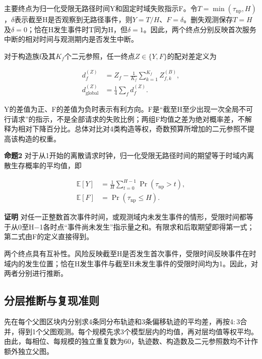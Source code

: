 \documentclass[UTF8,a4paper,twocolumn,fontset=none,zihao=5]{ctexart}
\begin{document}
主要终点为归一化受限无路径时间Y和固定时域失败指示F。令$T=\min(\tau_{\mathrm{np}},H)$，$\delta$表示截至H是否观察到无路径事件，则$Y=T/H$、$F=\delta$。删失观测保存$T=H$及$\delta=0$；恰在H发生事件时T同为H，但$\delta=1$。因此，两个终点分别反映首次服务中断的相对时间与观测期内是否发生中断。


对于构造族f及其$K_f$个二元参照，任一终点$Z\in\{Y,F\}$的配对差定义为



\begin{equation}
\begin{aligned}d_f^{(Z)}&=Z_f-\frac{1}{K_f}\sum_{k=1}^{K_f}Z_{f,k}^{(B)},\\d_{\mathrm{global}}^{(Z)}&=\frac{1}{4}\sum_f d_f^{(Z)}.\end{aligned}
\label{eq:13}\end{equation}


Y的差值为正、F的差值为负时表示有利方向。F是“截至H至少出现一次全局不可行请求”的指示，不是全部请求的失败比例；两组F均值之差为绝对概率差，不解释为相对下降百分比。总体对比对4类构造等权，奇数预算所增加的二元参照不提高该构造的权重。


\noindent\textbf{命题2} 对于从1开始的离散请求时钟，归一化受限无路径时间的期望等于时域内离散生存概率的平均值，即\par


\begin{equation}
\begin{aligned}\mathbb E[Y]&=\frac{1}{H}\sum_{t=0}^{H-1}\Pr(\tau_{\mathrm{np}}>t),\\\mathbb E[F]&=\Pr(\tau_{\mathrm{np}}\leq H).\end{aligned}
\label{eq:14}\end{equation}


\noindent\textbf{证明} 对任一正整数首次事件时间，或观测域内未发生事件的情形，受限时间都等于从0至H$-$1各时点“事件尚未发生”指示量之和。有限求和后取期望即得第一式；第二式由F的定义直接得到。\par

两个终点具有互补性。风险反映截至H是否发生首次事件，受限时间反映事件在时域内的发生位置；恰在H发生事件与截至H未发生事件的受限时间均为1。因此，对两者分别进行推断。


\subsection{分层推断与复现准则}

先在每个父图区块内分别求4条同分布轨迹和3条偏移轨迹的平均差，再按4$:$3合并，得到1个父图观测。每个规模先求3个模型层内的均值，再对层均值等权平均。由此，每相位、每规模的独立重复数为60，轨迹数、构造数及二元参照数均不计作额外独立父图。
\end{document}
